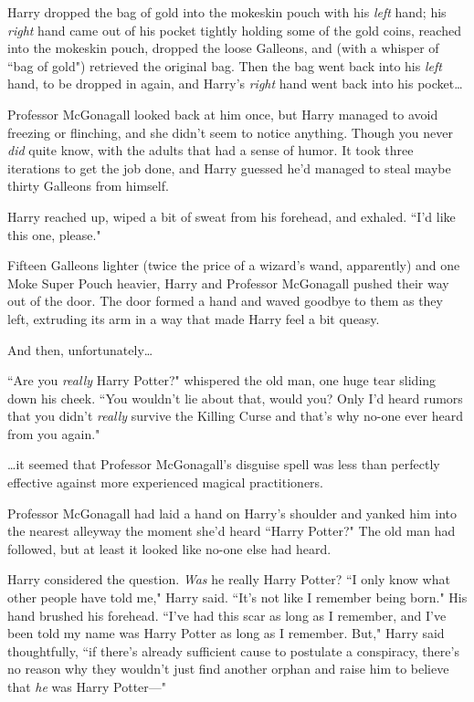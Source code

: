 Harry dropped the bag of gold into the mokeskin pouch with his \emph{left} hand; his \emph{right} hand came out of his pocket tightly holding some of the gold coins, reached into the mokeskin pouch, dropped the loose Galleons, and (with a whisper of ``bag of gold") retrieved the original bag. Then the bag went back into his \emph{left} hand, to be dropped in again, and Harry's \emph{right} hand went back into his pocket{\ldots}

Professor McGonagall looked back at him once, but Harry managed to avoid freezing or flinching, and she didn't seem to notice anything. Though you never \emph{did} quite know, with the adults that had a sense of humor. It took three iterations to get the job done, and Harry guessed he'd managed to steal maybe thirty Galleons from himself.

Harry reached up, wiped a bit of sweat from his forehead, and exhaled. ``I'd like this one, please."

Fifteen Galleons lighter (twice the price of a wizard's wand, apparently) and one Moke Super Pouch  heavier, Harry and Professor McGonagall pushed their way out of the door. The door formed a hand and waved goodbye to them as they left, extruding its arm in a way that made Harry feel a bit queasy.

And then, unfortunately{\ldots}

``Are you \emph{really} Harry Potter?" whispered the old man, one huge tear sliding down his cheek. ``You wouldn't lie about that, would you? Only I'd heard rumors that you didn't \emph{really} survive the Killing Curse and that's why no-one ever heard from you again."

{\ldots}it seemed that Professor McGonagall's disguise spell was less than perfectly effective against more experienced magical practitioners.

Professor McGonagall had laid a hand on Harry's shoulder and yanked him into the nearest alleyway the moment she'd heard ``Harry Potter?" The old man had followed, but at least it looked like no-one else had heard.

Harry considered the question. \emph{Was} he really Harry Potter? ``I only know what other people have told me," Harry said. ``It's not like I remember being born." His hand brushed his forehead. ``I've had this scar as long as I remember, and I've been told my name was Harry Potter as long as I remember. But," Harry said thoughtfully, ``if there's already sufficient cause to postulate a conspiracy, there's no reason why they wouldn't just find another orphan and raise him to believe that \emph{he} was Harry Potter—"

